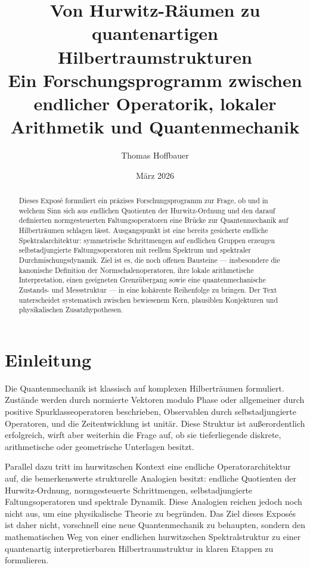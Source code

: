 \documentclass[12pt,a4paper]{article}
\title{\textbf{Von Hurwitz-Räumen zu quantenartigen Hilbertraumstrukturen}\\
	\large Ein Forschungsprogramm zwischen endlicher Operatorik, lokaler Arithmetik und Quantenmechanik}
\author{Thomas Hoffbauer}
\date{März 2026}
\theoremstyle{plain}
\theoremstyle{definition}
\theoremstyle{remark}
\begin{document}
	
	\maketitle
	
	\begin{abstract}
		Dieses Exposé formuliert ein präzises Forschungsprogramm zur Frage, ob und in welchem Sinn
		sich aus endlichen Quotienten der Hurwitz-Ordnung und den darauf definierten normgesteuerten
		Faltungsoperatoren eine Brücke zur Quantenmechanik auf Hilberträumen schlagen lässt.
		Ausgangspunkt ist eine bereits gesicherte endliche Spektralarchitektur: symmetrische
		Schrittmengen auf endlichen Gruppen erzeugen selbstadjungierte Faltungsoperatoren mit
		reellem Spektrum und spektraler Durchmischungsdynamik. Ziel ist es, die noch offenen
		Bausteine --- insbesondere die kanonische Definition der Normschalenoperatoren, ihre
		lokale arithmetische Interpretation, einen geeigneten Grenzübergang sowie eine
		quantenmechanische Zustands- und Messstruktur --- in eine kohärente Reihenfolge zu bringen.
		Der Text unterscheidet systematisch zwischen bewiesenem Kern, plausiblen Konjekturen
		und physikalischen Zusatzhypothesen.
	\end{abstract}
	
	\section{Einleitung}
	
	Die Quantenmechanik ist klassisch auf komplexen Hilberträumen formuliert. Zustände werden
	durch normierte Vektoren modulo Phase oder allgemeiner durch positive Spurklasseoperatoren
	beschrieben, Observablen durch selbstadjungierte Operatoren, und die Zeitentwicklung ist
	unitär. Diese Struktur ist außerordentlich erfolgreich, wirft aber weiterhin die Frage auf,
	ob sie tieferliegende diskrete, arithmetische oder geometrische Unterlagen besitzt.
	
	Parallel dazu tritt im hurwitzschen Kontext eine endliche Operatorarchitektur auf, die
	bemerkenswerte strukturelle Analogien besitzt: endliche Quotienten der Hurwitz-Ordnung,
	normgesteuerte Schrittmengen, selbstadjungierte Faltungsoperatoren und spektrale Dynamik.
	Diese Analogien reichen jedoch noch nicht aus, um eine physikalische Theorie zu begründen.
	Das Ziel dieses Exposés ist daher nicht, vorschnell eine neue Quantenmechanik zu behaupten,
	sondern den mathematischen Weg von einer endlichen hurwitzschen Spektralstruktur zu einer
	quantenartig interpretierbaren Hilbertraumstruktur in klaren Etappen zu formulieren.
	
\end{document}
